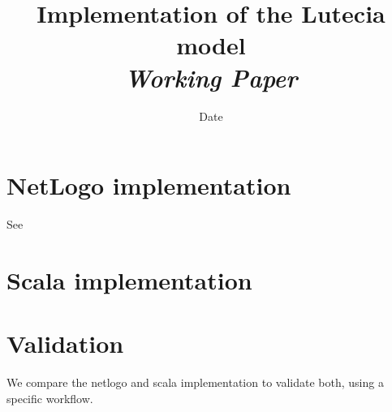 


\title{Implementation of the Lutecia model\bigskip\\
\textit{Working Paper}
}
\author{}
\date{Date}


\maketitle

\justify


\begin{abstract}

\end{abstract}


\section*{NetLogo implementation}

See \cite{}


\section*{Scala implementation}






\section*{Validation}

We compare the netlogo and scala implementation to validate both, using a specific workflow.




















